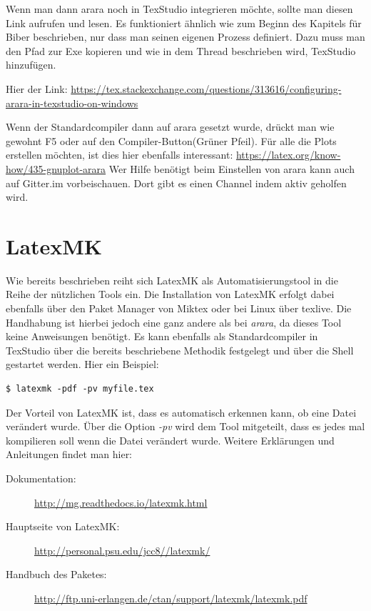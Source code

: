 Wenn man dann arara noch in TexStudio integrieren möchte, sollte man diesen Link aufrufen und lesen. Es funktioniert ähnlich wie zum Beginn des Kapitels für Biber beschrieben, nur dass man seinen eigenen Prozess definiert. Dazu muss man den Pfad zur Exe kopieren und wie in dem Thread beschrieben wird, TexStudio hinzufügen.

Hier der Link: \url{https://tex.stackexchange.com/questions/313616/configuring-arara-in-texstudio-on-windows}

Wenn der Standardcompiler dann auf arara gesetzt wurde, drückt man wie gewohnt F5 oder auf den Compiler-Button(Grüner Pfeil).
Für alle die Plots erstellen möchten, ist dies hier ebenfalls interessant: \url{https://latex.org/know-how/435-gnuplot-arara}
Wer Hilfe benötigt beim Einstellen von arara kann auch auf Gitter.im vorbeischauen. Dort gibt es einen Channel indem aktiv geholfen wird. 
\section{LatexMK}
Wie bereits beschrieben reiht sich LatexMK als Automatisierungstool in die Reihe der nützlichen Tools ein. Die Installation von LatexMK erfolgt dabei ebenfalls über den Paket Manager von Miktex oder bei Linux über texlive. Die Handhabung ist hierbei jedoch eine ganz andere als bei \emph{arara}, da dieses Tool keine Anweisungen benötigt. Es kann ebenfalls als Standardcompiler in TexStudio über die bereits beschriebene Methodik festgelegt und über die Shell gestartet werden. Hier ein Beispiel: 

\begin{lstlisting}[style=Bash]
$ latexmk -pdf -pv myfile.tex
\end{lstlisting}

Der Vorteil von LatexMK ist, dass es automatisch erkennen kann, ob eine Datei verändert wurde. Über die Option \emph{-pv} wird dem Tool mitgeteilt, dass es jedes mal kompilieren soll wenn die Datei verändert wurde. Weitere Erklärungen und Anleitungen findet man hier:
\begin{description}
	\item[Dokumentation: ] \url{http://mg.readthedocs.io/latexmk.html}
	\item[Hauptseite von LatexMK: ] \url{http://personal.psu.edu/jcc8//latexmk/}
	\item[Handbuch des Paketes: ] \url{http://ftp.uni-erlangen.de/ctan/support/latexmk/latexmk.pdf}
\end{description}

